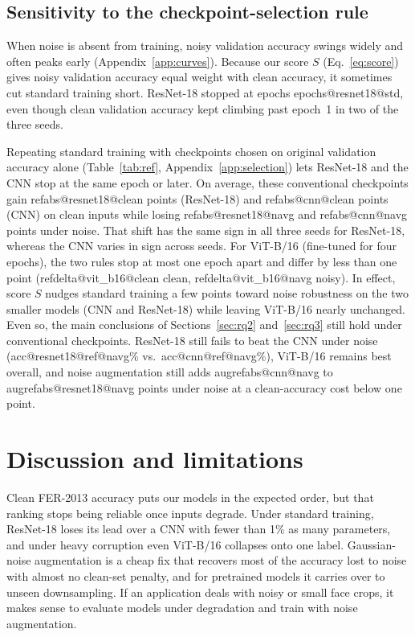 \documentclass{article}
\begin{document}
\subsection{Sensitivity to the checkpoint-selection rule}
\label{sec:selection-effect}

When noise is absent from training, noisy validation accuracy swings widely and often peaks early
(Appendix~\ref{app:curves}). Because our score $S$ (Eq.~\ref{eq:score}) gives noisy validation accuracy equal weight
with clean accuracy, it sometimes cut standard training short. ResNet-18 stopped at epochs \num{epochs@resnet18@std},
even though clean validation accuracy kept climbing past epoch~1 in two of the three seeds.

Repeating standard training with checkpoints chosen on original validation accuracy alone (Table~\ref{tab:ref},
Appendix~\ref{app:selection}) lets ResNet-18 and the CNN stop at the same epoch or later. On average, these conventional
checkpoints gain \num{refabs@resnet18@clean} points (ResNet-18) and \num{refabs@cnn@clean} points (CNN) on clean inputs
while losing \num{refabs@resnet18@navg} and \num{refabs@cnn@navg} points under noise. That shift has the same sign in
all three seeds for ResNet-18, whereas the CNN varies in sign across seeds. For ViT-B/16 (fine-tuned for four epochs), the two rules stop at
most one epoch apart and differ by less than one point (\num{refdelta@vit_b16@clean} clean,
\num{refdelta@vit_b16@navg} noisy). In effect, score $S$ nudges standard training a few points toward noise robustness
on the two smaller models (CNN and ResNet-18) while leaving ViT-B/16 nearly unchanged. Even so, the main conclusions of
Sections~\ref{sec:rq2} and~\ref{sec:rq3} still hold under conventional checkpoints. ResNet-18 still fails to beat the
CNN under noise (\num{acc@resnet18@ref@navg}\% vs.\ \num{acc@cnn@ref@navg}\%), ViT-B/16 remains best overall, and noise
augmentation still adds \num{augrefabs@cnn@navg} to \num{augrefabs@resnet18@navg} points under noise at a clean-accuracy
cost below one point.

\section{Discussion and limitations}
\label{sec:discussion}

Clean FER-2013 accuracy puts our models in the expected order, but that ranking stops being reliable once inputs
degrade. Under standard training, ResNet-18 loses its lead over a CNN with fewer than 1\% as many parameters, and under
heavy corruption even ViT-B/16 collapses onto one label. Gaussian-noise augmentation is a cheap fix that recovers most
of the accuracy lost to noise with almost no clean-set penalty, and for pretrained models it carries over to unseen
downsampling. If an application deals with noisy or small face crops, it makes sense to evaluate models under degradation and train
with noise augmentation.
\end{document}
